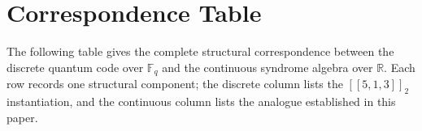 \documentclass[11pt,a4paper]{article}
\theoremstyle{definition}
\newcommand{\Rbb}{\mathbb{R}}
\newcommand{\Fbb}{\mathbb{F}}
\begin{document}
\newpage

\appendix

\section{Correspondence Table}
\label{app:correspondence}

The following table gives the complete structural correspondence between the discrete quantum code over $\Fbb_q$ and the continuous syndrome algebra over $\Rbb$. Each row records one structural component; the discrete column lists the $[\![5,1,3]\!]_2$ instantiation, and the continuous column lists the analogue established in this paper.
\end{document}
